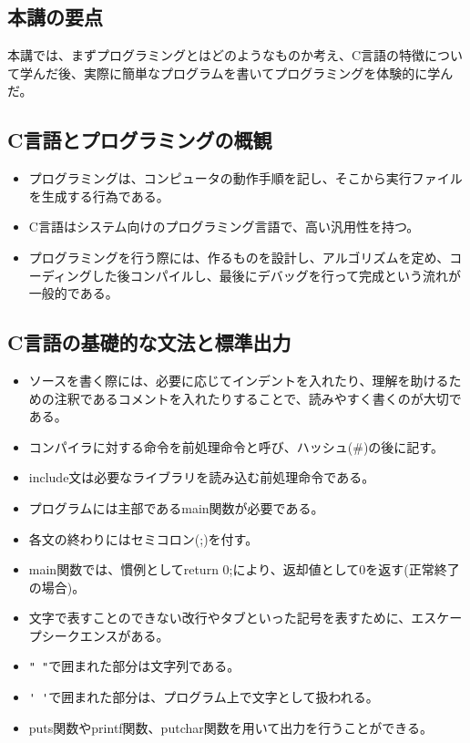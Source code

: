 \begin{shadebox}
\section*{本講の要点}
本講では、まずプログラミングとはどのようなものか考え、C言語の特徴について学んだ後、実際に簡単なプログラムを書いてプログラミングを体験的に学んだ。
\subsection*{C言語とプログラミングの概観}
\begin{itemize}
\item プログラミングは、コンピュータの動作手順を記し、そこから実行ファイルを生成する行為である。
\item C言語はシステム向けのプログラミング言語で、高い汎用性を持つ。
\item プログラミングを行う際には、作るものを設計し、アルゴリズムを定め、コーディングした後コンパイルし、最後にデバッグを行って完成という流れが一般的である。
\end{itemize}

\subsection*{C言語の基礎的な文法と標準出力}
\begin{itemize}
\item ソースを書く際には、必要に応じてインデントを入れたり、理解を助けるための注釈であるコメントを入れたりすることで、読みやすく書くのが大切である。
\item コンパイラに対する命令を前処理命令と呼び、ハッシュ(\#)の後に記す。
\item include文は必要なライブラリを読み込む前処理命令である。
\item プログラムには主部であるmain関数が必要である。
\item 各文の終わりにはセミコロン(;)を付す。
\item main関数では、慣例としてreturn 0;により、返却値として0を返す(正常終了の場合)。
\item 文字で表すことのできない改行やタブといった記号を表すために、エスケープシークエンスがある。
\item \verb|" "|で囲まれた部分は文字列である。
\item \verb|' '|で囲まれた部分は、プログラム上で文字として扱われる。
\item puts関数やprintf関数、putchar関数を用いて出力を行うことができる。
\end{itemize}
\end{shadebox}
